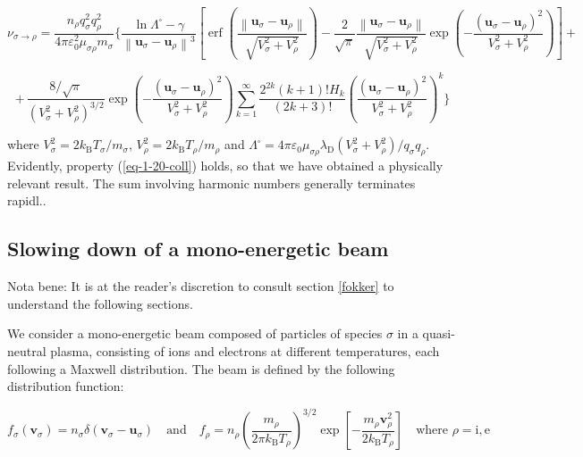 \begin{equation*}
    \nu_{\sigma\to\rho}=\frac{n_\rho q_\sigma^2 q_\rho^2}{4\pi \varepsilon_0^2\mu_{\sigma\rho}m_\sigma}\Biggl\{ \frac{\ln{\Lambda^\square}-\gamma}{\left\|\mathbf{u}_\sigma-\mathbf{u}_\rho\right\|^3}\left[\operatorname{erf}{\left(\frac{\left\|\mathbf{u}_\sigma-\mathbf{u}_\rho\right\|}{\sqrt{V_\sigma^2+V_\rho^2}}\right)}-\frac{2}{\sqrt{\pi}}\frac{\left\|\mathbf{u}_\sigma-\mathbf{u}_\rho\right\|}{\sqrt{V_\sigma^2+V_\rho^2}}\exp{\left(-\frac{\left(\mathbf{u}_\sigma-\mathbf{u}_\rho\right)^2}{V_\sigma^2+V_\rho^2}\right)}\right]+
\end{equation*}

\begin{equation}
    \label{eq-1-21-coll}
    +\,\frac{8/\sqrt{\pi}}{(V_\sigma^2+V_\rho^2)^{3/2}}\exp{\left(-\frac{\left(\mathbf{u}_\sigma-\mathbf{u}_\rho\right)^2}{V_\sigma^2+V_\rho^2}\right)}\sum_{k=1}^\infty \frac{2^{2k}(k+1)!H_{k}}{(2k+3)!}\left(\frac{\left(\mathbf{u}_\sigma-\mathbf{u}_\rho\right)^2}{V_\sigma^2+V_\rho^2}\right)^{k} \Biggr\}
\end{equation}

where $V_\sigma^2=2k_\text{B}T_\sigma/m_\sigma$, $V_\rho^2=2k_\text{B}T_\rho/m_\rho$ and $\Lambda^\square=4\pi \varepsilon_0\mu_{\sigma\rho}\lambda_{\mathrm{D}}\left(V_\sigma^2+V_\rho^2\right)/q_\sigma q_\rho$. Evidently, property (\ref{eq-1-20-coll}) holds, so that we have obtained a physically relevant result. The sum involving harmonic numbers generally terminates rapidl..

\subsection{Slowing down of a mono-energetic beam}

Nota bene: It is at the reader's discretion to consult section \ref{fokker} to understand the following sections.

\vspace*{5pt}

We consider a mono-energetic beam composed of particles of species $\sigma$ in a quasi-neutral plasma, consisting of ions and electrons at different temperatures, each following a Maxwell distribution. The beam is defined by the following distribution function:

\begin{equation*}
    f_\sigma(\mathbf{v}_\sigma)=n_\sigma\delta(\mathbf{v}_\sigma-\mathbf{u}_\sigma)\quad\text{and}\quad f_\rho=n_\rho\left(\frac{m_\rho}{2\pi k_\mathrm{B}T_\rho}\right)^{3/2}\exp{\left[-\frac{m_\rho\mathbf{v}_\rho^2}{2k_\mathrm{B}T_\rho}\right]}\quad\text{where }\rho=\mathrm{i},\text{e}
\end{equation*}


